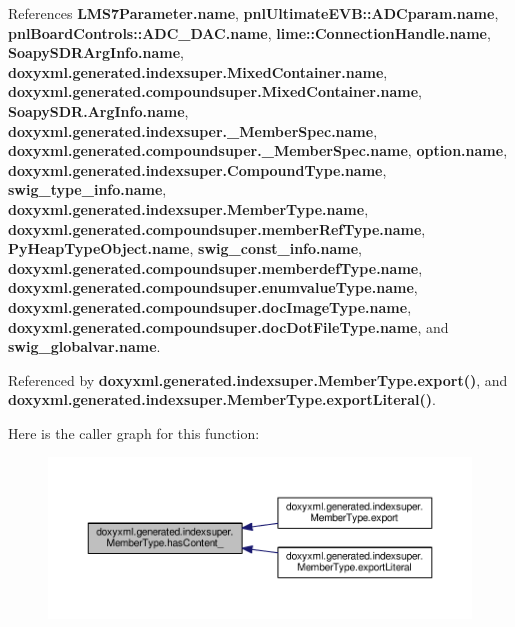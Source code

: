 References {\bf L\+M\+S7\+Parameter.\+name}, {\bf pnl\+Ultimate\+E\+V\+B\+::\+A\+D\+Cparam.\+name}, {\bf pnl\+Board\+Controls\+::\+A\+D\+C\+\_\+\+D\+A\+C.\+name}, {\bf lime\+::\+Connection\+Handle.\+name}, {\bf Soapy\+S\+D\+R\+Arg\+Info.\+name}, {\bf doxyxml.\+generated.\+indexsuper.\+Mixed\+Container.\+name}, {\bf doxyxml.\+generated.\+compoundsuper.\+Mixed\+Container.\+name}, {\bf Soapy\+S\+D\+R.\+Arg\+Info.\+name}, {\bf doxyxml.\+generated.\+indexsuper.\+\_\+\+Member\+Spec.\+name}, {\bf doxyxml.\+generated.\+compoundsuper.\+\_\+\+Member\+Spec.\+name}, {\bf option.\+name}, {\bf doxyxml.\+generated.\+indexsuper.\+Compound\+Type.\+name}, {\bf swig\+\_\+type\+\_\+info.\+name}, {\bf doxyxml.\+generated.\+indexsuper.\+Member\+Type.\+name}, {\bf doxyxml.\+generated.\+compoundsuper.\+member\+Ref\+Type.\+name}, {\bf Py\+Heap\+Type\+Object.\+name}, {\bf swig\+\_\+const\+\_\+info.\+name}, {\bf doxyxml.\+generated.\+compoundsuper.\+memberdef\+Type.\+name}, {\bf doxyxml.\+generated.\+compoundsuper.\+enumvalue\+Type.\+name}, {\bf doxyxml.\+generated.\+compoundsuper.\+doc\+Image\+Type.\+name}, {\bf doxyxml.\+generated.\+compoundsuper.\+doc\+Dot\+File\+Type.\+name}, and {\bf swig\+\_\+globalvar.\+name}.



Referenced by {\bf doxyxml.\+generated.\+indexsuper.\+Member\+Type.\+export()}, and {\bf doxyxml.\+generated.\+indexsuper.\+Member\+Type.\+export\+Literal()}.



Here is the caller graph for this function\+:
\nopagebreak
\begin{figure}[H]
\begin{center}
\leavevmode
\includegraphics[width=350pt]{d0/da4/classdoxyxml_1_1generated_1_1indexsuper_1_1MemberType_a9bd8eb0cb3d1d56ab13967a30eaed79b_icgraph}
\end{center}
\end{figure}


